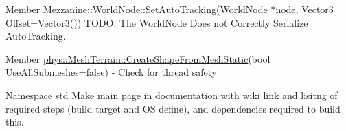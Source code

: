 \begin{DoxyDescription}
\item[Member \hyperlink{classMezzanine_1_1WorldNode_accb11fd94c98482d5d1b28894a1f4d9b}{Mezzanine::WorldNode::SetAutoTracking}(WorldNode $\ast$node, Vector3 Offset=Vector3()) ]TODO: The WorldNode Does not Correctly Serialize AutoTracking. 
\end{DoxyDescription}

\label{todo__todo000017}
\hypertarget{todo__todo000017}{}
 
\begin{DoxyDescription}
\item[Member \hyperlink{classphys_1_1MeshTerrain_af1f15dead93f0c797e1b89ee9dbf295b}{phys::MeshTerrain::CreateShapeFromMeshStatic}(bool UseAllSubmeshes=false) ]-\/ Check for thread safety 
\end{DoxyDescription}

\label{todo__todo000008}
\hypertarget{todo__todo000008}{}
 
\begin{DoxyDescription}
\item[Namespace \hyperlink{namespacestd}{std} ]Make main page in documentation with wiki link and lisitng of required steps (build target and OS define), and dependencies required to build this. 
\end{DoxyDescription}